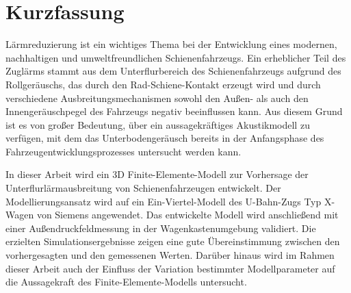 \section*{Kurzfassung}

Lärmreduzierung ist ein wichtiges Thema bei der Entwicklung eines modernen, nachhaltigen und umweltfreundlichen Schienenfahrzeugs. Ein erheblicher Teil des Zuglärms stammt aus dem Unterflurbereich des Schienenfahrzeugs aufgrund des Rollgeräuschs, das durch den Rad-Schiene-Kontakt erzeugt wird und durch verschiedene Ausbreitungsmechanismen sowohl den Außen- als auch den Innengeräuschpegel des Fahrzeugs negativ beeinflussen kann. Aus diesem Grund ist es von großer Bedeutung, über ein aussagekräftiges Akustikmodell zu verfügen, mit dem das Unterbodengeräusch bereits in der Anfangsphase des Fahrzeugentwicklungsprozesses untersucht werden kann.

In dieser Arbeit wird ein 3D Finite-Elemente-Modell zur Vorhersage der Unterflurlärmausbreitung von Schienenfahrzeugen entwickelt. Der Modellierungsansatz wird auf ein Ein-Viertel-Modell des U-Bahn-Zugs Typ X-Wagen von Siemens angewendet. Das entwickelte Modell wird anschließend mit einer Außendruckfeldmessung in der Wagenkastenumgebung validiert. Die erzielten Simulationsergebnisse zeigen eine gute Übereinstimmung zwischen den vorhergesagten und den gemessenen Werten. Darüber hinaus wird im Rahmen dieser Arbeit auch der Einfluss der Variation bestimmter Modellparameter auf die Aussagekraft des Finite-Elemente-Modells untersucht.